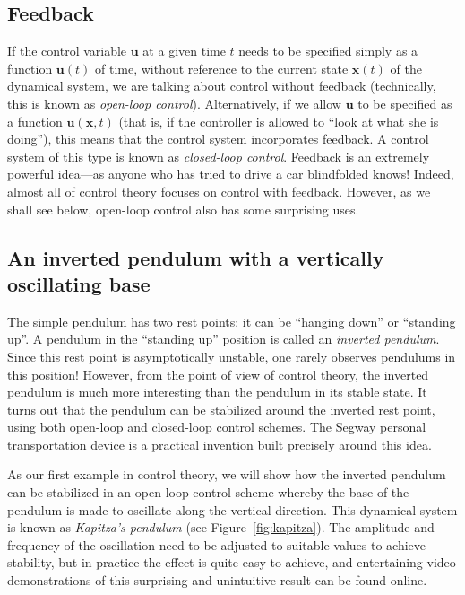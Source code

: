 \documentclass[12pt]{amsart}
\newcounter{example}
\begin{document}
\subsection{Feedback} If the control variable $\mathbf{u}$ at a given time $t$ needs to be specified simply as a function $\mathbf{u}(t)$ of time, without reference to the current state $\mathbf{x}(t)$ of the dynamical system, we are talking about control without feedback (technically, this is known as \emph{open-loop control}). Alternatively, if we allow $\mathbf{u}$ to be specified as a function $\mathbf{u}(\mathbf{x},t)$ (that is, if the controller is allowed to ``look at what she is doing''), this means that the control system incorporates feedback. A control system of this type is known as \emph{closed-loop control}. Feedback is an extremely powerful idea---as anyone who has tried to drive a car blindfolded knows! Indeed, almost all of control theory focuses on control with feedback. However, as we shall see below, open-loop control also has some surprising uses.

\subsection{An inverted pendulum with a vertically oscillating base} The simple pendulum has two rest points: it can be ``hanging down'' or ``standing up''. A pendulum in the ``standing up'' position is called an \emph{inverted pendulum}. Since this rest point is asymptotically unstable, one rarely observes pendulums in this position! However, from the point of view of control theory, the inverted pendulum is much more interesting than the pendulum in its stable state. It turns out that the pendulum can be stabilized around the inverted rest point, using both open-loop and closed-loop control schemes. The Segway personal transportation device is a practical invention built precisely around this idea.

As our first example in control theory, we will show how the inverted pendulum can be stabilized in an open-loop control scheme whereby the base of the pendulum is made to oscillate along the vertical direction. This dynamical system is known as \emph{Kapitza's pendulum} (see Figure~\ref{fig:kapitza}). The amplitude and frequency of the oscillation need to be adjusted to suitable values to achieve stability, but in practice the effect is quite easy to achieve, and entertaining video demonstrations of this surprising and unintuitive result can be found online. 
\end{document}
